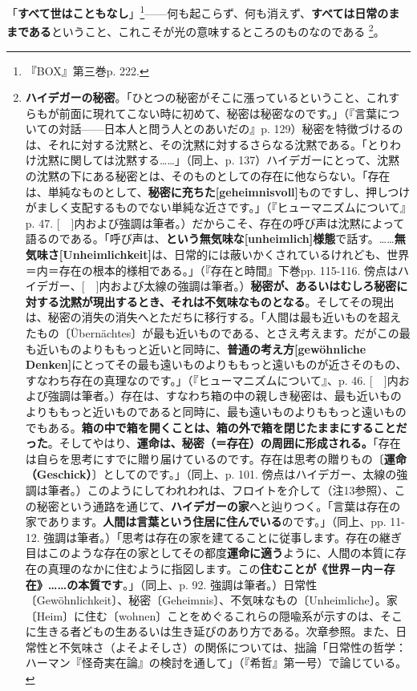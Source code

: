 \documentclass[a4paper]{jsarticle}
\begin{document}
「\textbf{すべて世はこともなし}」\footnote{『BOX』第三巻p. 222.}------何も起こらず、何も消えず、\textbf{すべては日常のままである}ということ、これこそが光の意味するところのものなのである
\footnote{\textbf{ハイデガーの秘密}。「ひとつの秘密がそこに漲っているということ、これすらもが前面に現れてこない時に初めて、秘密は秘密なのです。」（『言葉についての対話------日本人と問う人とのあいだの』p. 129）秘密を特徴づけるのは、それに対する沈黙と、その沈黙に対するさらなる沈黙である。「とりわけ沈黙に関しては沈黙する……」（同上、p. 137）ハイデガーにとって、沈黙の沈黙の下にある秘密とは、そのものとしての存在に他ならない。「存在は、単純なものとして、\textbf{秘密に充ちた[geheimnisvoll]}ものですし、押しつけがましく支配するものでない単純な近さです。」（『ヒューマニズムについて』p. 47. [　]内および強調は筆者。）だからこそ、存在の呼び声は沈黙によって語るのである。「呼び声は、\textbf{という無気味な[unheimlich]様態}で話す。……\textbf{無気味さ[Unheimlichkeit]}は、日常的には蔽いかくされているけれども、世界＝内＝存在の根本的様相である。」（『存在と時間』下巻pp. 115-116. 傍点はハイデガー、[　]内および太線の強調は筆者。）\textbf{秘密が、あるいはむしろ秘密に対する沈黙が現出するとき、それは不気味なものとなる}。そしてその現出は、秘密の消失の消失へとただちに移行する。「人間は最も近いものを超えたもの〔\"Ubern\"achtes〕が最も近いものである、とさえ考えます。だがこの最も近いものよりももっと近いと同時に、\textbf{普通の考え方[gewöhnliche Denken]}にとってその最も遠いものよりももっと遠いものが近さそのもの、すなわち存在の真理なのです。」（『ヒューマニズムについて』、p. 46. [　]内および強調は筆者。）存在は、すなわち箱の中の親しき秘密は、最も近いものよりももっと近いものであると同時に、最も遠いものよりももっと遠いものでもある。\textbf{箱の中で箱を開くことは、箱の外で箱を閉じたままにすることだった}。そしてやはり、\textbf{運命は、秘密（＝存在）の周囲に形成される。}「存在は自らを思考にすでに贈り届けているのです。存在は思考の贈りもの〔\textbf{運命（Geschick）}〕としてのです。」（同上、p. 101. 傍点はハイデガー、太線の強調は筆者。）このようにしてわれわれは、フロイトを介して（注13参照）、この秘密という通路を通じて、\textbf{ハイデガーの家}へと辿りつく。「言葉は存在の家であります。\textbf{人間は言葉という住居に住んでいる}のです。」（同上、pp. 11-12. 強調は筆者。）「思考は存在の家を建てることに従事します。存在の継ぎ目はこのような存在の家としてその都度\textbf{運命に適う}ように、人間の本質に存在の真理のなかに住むように指図します。この\textbf{住むことが《世界－内－存在》……の本質です}。」（同上、p. 92. 強調は筆者。）日常性〔Gew\"ohnlichkeit〕、秘密〔Geheimnis〕、不気味なもの〔Unheimliche〕。家〔Heim〕に住む〔wohnen〕ことをめぐるこれらの隠喩系が示すのは、そこに生きる者どもの生あるいは生き延びのあり方である。次章参照。また、日常性と不気味さ（よそよそしさ）の関係については、拙論「日常性の哲学：ハーマン『怪奇実在論』の検討を通して」（『希哲』第一号）で論じている。}。
\end{document}
